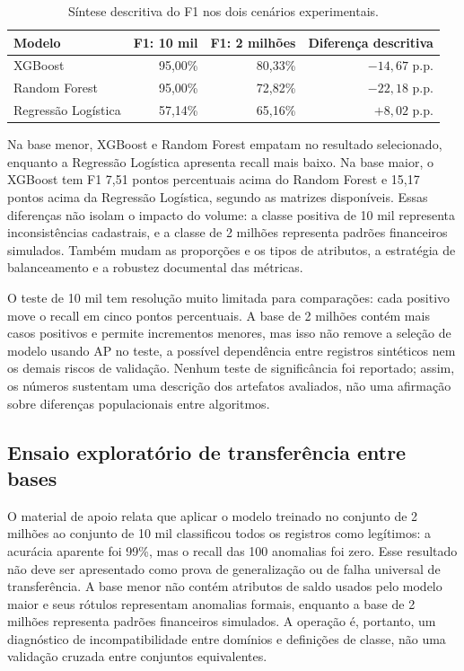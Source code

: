 \documentclass[11pt,a4paper]{article}
\begin{document}
\begin{table}[htbp]
    \centering
    \caption{Síntese descritiva do F1 nos dois cenários experimentais.}\label{tab:sintese-cenarios}%
    \small
    \begin{tabular}{lrrr}
        \toprule
        \textbf{Modelo} & \textbf{F1: 10 mil} & \textbf{F1: 2 milhões} & \textbf{Diferença descritiva} \\
        \midrule
        XGBoost & 95,00\% & 80,33\% & $-14,67$ p.p. \\
        Random Forest & 95,00\% & 72,82\% & $-22,18$ p.p. \\
        Regressão Logística & 57,14\% & 65,16\% & $+8,02$ p.p. \\
        \bottomrule
    \end{tabular}
\end{table}

Na base menor, XGBoost e Random Forest empatam no resultado selecionado, enquanto a Regressão Logística apresenta recall mais baixo. Na base maior, o XGBoost tem F1 7,51 pontos percentuais acima do Random Forest e 15,17 pontos acima da Regressão Logística, segundo as matrizes disponíveis. Essas diferenças não isolam o impacto do volume: a classe positiva de 10 mil representa inconsistências cadastrais, e a classe de 2 milhões representa padrões financeiros simulados. Também mudam as proporções e os tipos de atributos, a estratégia de balanceamento e a robustez documental das métricas.

O teste de 10 mil tem resolução muito limitada para comparações: cada positivo move o recall em cinco pontos percentuais. A base de 2 milhões contém mais casos positivos e permite incrementos menores, mas isso não remove a seleção de modelo usando AP no teste, a possível dependência entre registros sintéticos nem os demais riscos de validação. Nenhum teste de significância foi reportado; assim, os números sustentam uma descrição dos artefatos avaliados, não uma afirmação sobre diferenças populacionais entre algoritmos.

\subsection{Ensaio exploratório de transferência entre bases}

O material de apoio relata que aplicar o modelo treinado no conjunto de 2 milhões ao conjunto de 10 mil classificou todos os registros como legítimos: a acurácia aparente foi 99\%, mas o recall das 100 anomalias foi zero. Esse resultado não deve ser apresentado como prova de generalização ou de falha universal de transferência. A base menor não contém atributos de saldo usados pelo modelo maior e seus rótulos representam anomalias formais, enquanto a base de 2 milhões representa padrões financeiros simulados. A operação é, portanto, um diagnóstico de incompatibilidade entre domínios e definições de classe, não uma validação cruzada entre conjuntos equivalentes.
\end{document}

